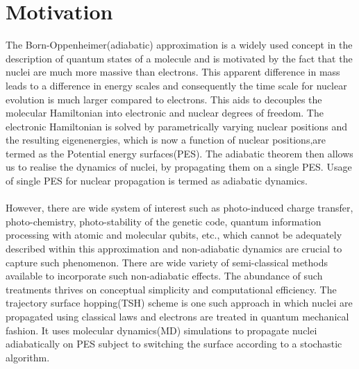 \section{Motivation}

The Born-Oppenheimer(adiabatic) approximation\cite{Born_Oppen} is a widely used concept in the description of quantum states of a molecule and is motivated by the fact that the nuclei are much more massive than electrons. This apparent difference in mass leads to a difference in energy scales and consequently the time scale for nuclear evolution is much larger compared to  electrons. This  aids to decouples the molecular Hamiltonian into electronic and  nuclear degrees of freedom. The electronic Hamiltonian is solved by parametrically varying nuclear positions and the resulting  eigenenergies, which is now a function of nuclear positions,are  termed as the Potential energy surfaces(PES). The adiabatic  theorem then allows us to realise the dynamics of nuclei, by propagating them on a single PES. Usage of single PES for nuclear propagation is termed as adiabatic dynamics. \\ \\
However, there are wide system of interest such as photo-induced charge transfer, photo-chemistry, photo-stability of the genetic code, quantum information processing with atomic and molecular qubits, etc.,\cite{app_1,app_2,app_3} which cannot be adequately described within this approximation and non-adiabatic dynamics are crucial to capture such phenomenon. There are wide variety of semi-classical methods available to incorporate such non-adiabatic effects.\cite{tully_discussion} The abundance of such treatments thrives  on conceptual simplicity and computational efficiency. The trajectory surface hopping(TSH) scheme is one such approach in which nuclei are propagated using classical laws and electrons are treated in quantum mechanical fashion.\cite{tully_1,tsh_barbatti,wang_TSH,TSH_review} It uses molecular dynamics(MD) simulations to propagate nuclei adiabatically on PES subject to switching the surface according to a stochastic algorithm. \\ \\
